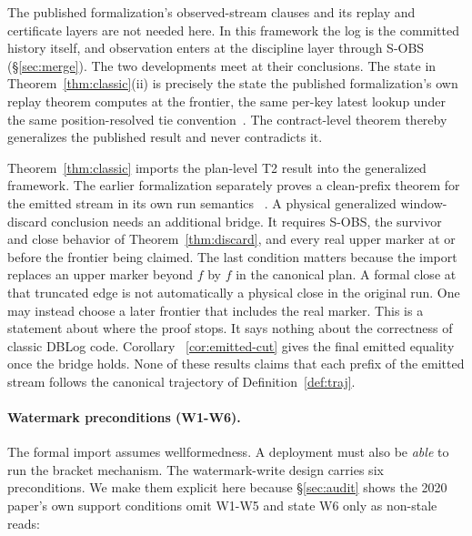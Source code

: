 \documentclass[sigconf,nonacm,10pt]{acmart}
\theoremstyle{plain}
\theoremstyle{definition}
\begin{document}
The published formalization's observed-stream clauses and its
replay and certificate layers are not needed here. In
this framework the log is the committed history itself, and
observation enters at the discipline layer through S-OBS
(\S\ref{sec:merge}). The two developments meet at their
conclusions. The state in Theorem~\ref{thm:classic}(ii) is
precisely the state the published formalization's own replay
theorem computes at the frontier, the same per-key latest
lookup under the same position-resolved tie
convention~\cite{andreakis2026virtualcuts}. The
contract-level theorem thereby generalizes the published result
and never contradicts it.

Theorem~\ref{thm:classic} imports the plan-level T2 result into the
generalized framework. The earlier formalization separately proves a
clean-prefix theorem for the emitted stream in its own run semantics
~\cite{andreakis2026virtualcuts}. A physical generalized
window-discard conclusion needs an additional bridge. It requires
S-OBS, the survivor and close behavior of
Theorem~\ref{thm:discard}, and every real upper marker at or before the
frontier being claimed. The last condition matters because the import
replaces an upper marker beyond $f$ by $f$ in the canonical plan. A
formal close at that truncated edge is not automatically a physical
close in the original run. One may instead choose a later frontier
that includes the real marker. This is a statement about where the proof stops. It says nothing
about the correctness of classic DBLog code. Corollary
~\ref{cor:emitted-cut} gives the final emitted equality once the bridge
holds. None of these results claims that each prefix of the emitted
stream follows the canonical trajectory of
Definition~\ref{def:traj}.

\paragraph{Watermark preconditions (W1-W6).}
The formal import assumes wellformedness. A deployment must also
be \emph{able} to run the bracket mechanism. The
watermark-write design carries six preconditions. We make them explicit
here because \S\ref{sec:audit} shows the 2020 paper's own support
conditions omit W1-W5 and state W6 only as non-stale reads:
\end{document}
